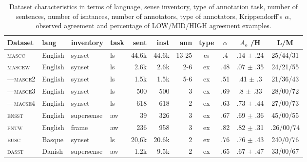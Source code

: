 \documentclass[11pt,a4paper]{article}
\begin{document}
\begin{table}[Ht!]

\begin{center}
  \begin{tabular}{llllrrrcccc}
  \toprule 

Dataset& lang & inventory & task & sent & inst & ann & type & $\alpha$ & $A_o$ /H& L/M\\ 
\midrule 

\textsc{mascc} & English & synset & ls & 44.6k & 44.6k & 13-25 & cs & .4 & .14 $\pm$ .24 & 25/44/31\\
\textsc{mascew} & English & synset & ls & 2.6k & 2.6k & 2-6 & ex & .48 & .07 $\pm$ .35 & 24/21/55\\
---\textsc{masce2} & English & synset & ls & 1.5k & 1.5k & 5-6 & ex & .51 & .41 $\pm$ .3 & 21/36/43\\
---\textsc{masce3} & English & synset & ls & 500 & 500 & 3 & ex & .69 & .8 $\pm$ .33 & 28/00/72\\
---\textsc{macse4} & English & synset & ls & 618 & 618 & 2 & ex & .63 & .73 $\pm$ .44 & 27/00/73\\
\textsc{ensst} & English & supersense & aw & 39 & 326 & 3 & ex & .67 & .69 $\pm$ .36 & 45/00/55\\
\textsc{fntw} & English & frame & aw & 236 & 958 & 3 & ex & .82 & .82 $\pm$ .31 & .26/00/74\\

\textsc{eusc} & Basque & synset & ls & 20,6k & 20.6k & 2 & ex & .76 & .76 $\pm$ .43 & 240/0/76\\
\textsc{dasst} & Danish & supersense & aw & 1.2k & 9.5k & 2 & ex & .65 & .67 $\pm$ .47 & 33/00/67\\


\bottomrule

  \end{tabular}  
\end{center}
\caption{Dataset characteristics \label{tab:data} in terms of language, sense inventory, type of annotation task, number of sentences, number of isntances, number of annotators, type of annotators, Krippendorff's $\alpha$, observed agreement and percentage of LOW/MID/HIGH agreement examples.}
\end{table} 
\end{document}
